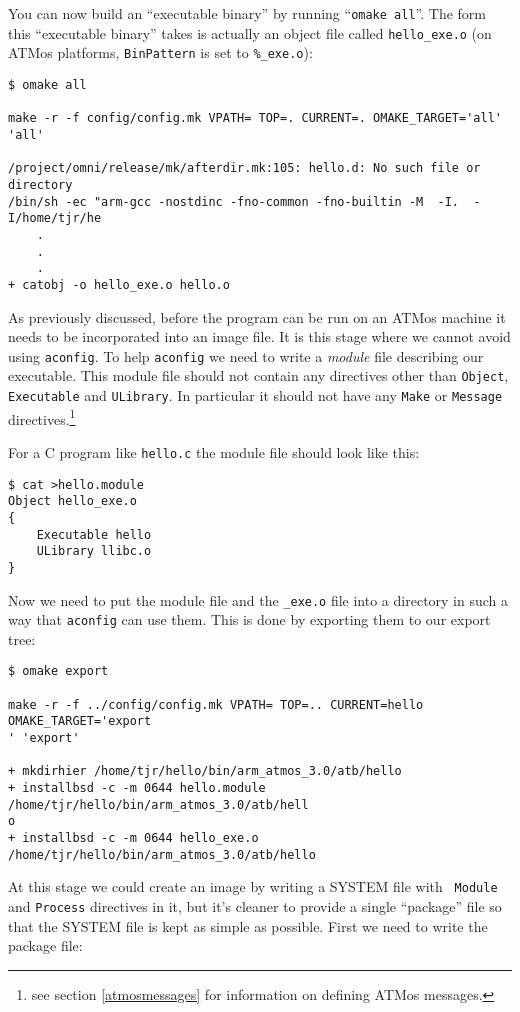 \documentclass[11pt,twoside,onecolumn]{article}
\begin{document}
You can now build an ``executable binary'' by running ``{\tt omake all}''.  The
form this ``executable binary'' takes is actually an object file called
\verb|hello_exe.o| (on ATMos platforms, {\tt BinPattern} is set to
\verb|%_exe.o|):

{\small \begin{verbatim}
$ omake all

make -r -f config/config.mk VPATH= TOP=. CURRENT=. OMAKE_TARGET='all' 'all'

/project/omni/release/mk/afterdir.mk:105: hello.d: No such file or directory
/bin/sh -ec "arm-gcc -nostdinc -fno-common -fno-builtin -M  -I.  -I/home/tjr/he
    .
    .
    .
+ catobj -o hello_exe.o hello.o 
\end{verbatim}}

As previously discussed, before the program can be run on an ATMos machine it
needs to be incorporated into an image file.  It is this stage where we cannot
avoid using {\tt aconfig}.  To help {\tt aconfig} we need to write a {\em
module} file describing our executable.  This module file should not contain
any directives other than {\tt Object}, {\tt Executable} and {\tt ULibrary}.
In particular it should not have any {\tt Make} or {\tt Message}
directives.\footnote{see section \ref{atmosmessages} for information on
defining ATMos messages.}

For a C program like {\tt hello.c} the module file should look like this:

{\small \begin{verbatim}
$ cat >hello.module
Object hello_exe.o
{
    Executable hello
    ULibrary llibc.o
}
\end{verbatim}}

Now we need to put the module file and the \verb|_exe.o| file into a directory
in such a way that {\tt aconfig} can use them.  This is done by exporting them
to our export tree:

{\small \begin{verbatim}
$ omake export

make -r -f ../config/config.mk VPATH= TOP=.. CURRENT=hello OMAKE_TARGET='export
' 'export'

+ mkdirhier /home/tjr/hello/bin/arm_atmos_3.0/atb/hello 
+ installbsd -c -m 0644 hello.module /home/tjr/hello/bin/arm_atmos_3.0/atb/hell
o 
+ installbsd -c -m 0644 hello_exe.o /home/tjr/hello/bin/arm_atmos_3.0/atb/hello
\end{verbatim}}

At this stage we could create an image by writing a SYSTEM file with {\tt
Module} and {\tt Process} directives in it, but it's cleaner to provide a
single ``package'' file so that the SYSTEM file is kept as simple as possible.
First we need to write the package file:
\end{document}
